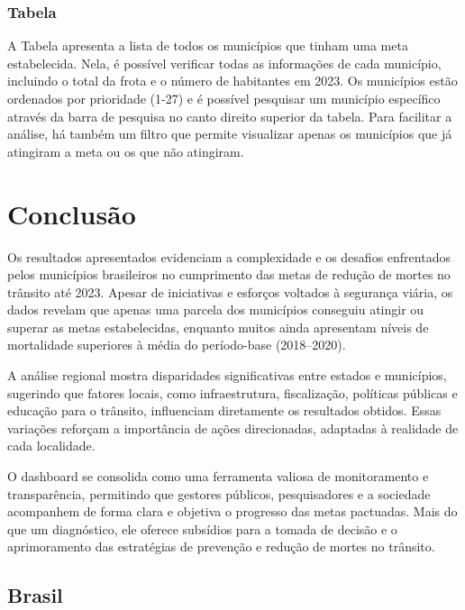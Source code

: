 \documentclass[
  letterpaper,
  DIV=11,
  numbers=noendperiod]{scrreprt}
\begin{document}
\subsection{Tabela}\label{tabela}

A Tabela apresenta a lista de todos os municípios que tinham uma meta
estabelecida. Nela, é possível verificar todas as informações de cada
município, incluindo o total da frota e o número de habitantes em 2023.
Os municípios estão ordenados por prioridade (1-27) e é possível
pesquisar um município específico através da barra de pesquisa no canto
direito superior da tabela. Para facilitar a análise, há também um
filtro que permite visualizar apenas os municípios que já atingiram a
meta ou os que não atingiram.


\chapter{Conclusão}\label{conclusuxe3o}

Os resultados apresentados evidenciam a complexidade e os desafios
enfrentados pelos municípios brasileiros no cumprimento das metas de
redução de mortes no trânsito até 2023. Apesar de iniciativas e esforços
voltados à segurança viária, os dados revelam que apenas uma parcela dos
municípios conseguiu atingir ou superar as metas estabelecidas, enquanto
muitos ainda apresentam níveis de mortalidade superiores à média do
período-base (2018--2020).

A análise regional mostra disparidades significativas entre estados e
municípios, sugerindo que fatores locais, como infraestrutura,
fiscalização, políticas públicas e educação para o trânsito, influenciam
diretamente os resultados obtidos. Essas variações reforçam a
importância de ações direcionadas, adaptadas à realidade de cada
localidade.

O dashboard se consolida como uma ferramenta valiosa de monitoramento e
transparência, permitindo que gestores públicos, pesquisadores e a
sociedade acompanhem de forma clara e objetiva o progresso das metas
pactuadas. Mais do que um diagnóstico, ele oferece subsídios para a
tomada de decisão e o aprimoramento das estratégias de prevenção e
redução de mortes no trânsito.

\section{Brasil}\label{brasil}
\end{document}
